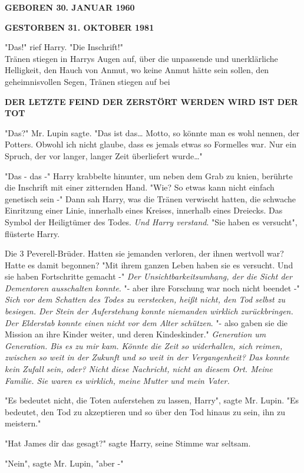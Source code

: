 {\textbf{GEBOREN 30. JANUAR 1960}

\textbf{GESTORBEN 31. OKTOBER 1981}

"Das!" rief Harry. "Die Inschrift!"\\ Tränen stiegen in Harrys Augen auf, über die unpassende und unerklärliche Helligkeit, den Hauch von Anmut, wo keine Anmut hätte sein sollen, den geheimnisvollen Segen, Tränen stiegen auf bei

\textbf{DER LETZTE FEIND DER ZERSTÖRT WERDEN WIRD IST DER TOT}

"Das?" Mr. Lupin sagte. "Das ist das… Motto, so könnte man es wohl nennen, der Potters. Obwohl ich nicht glaube, dass es jemals etwas so Formelles war. Nur ein Spruch, der vor langer, langer Zeit überliefert wurde…"

"Das - das -" Harry krabbelte hinunter, um neben dem Grab zu knien, berührte die Inschrift mit einer zitternden Hand. "Wie? So etwas kann nicht einfach genetisch sein -" Dann sah Harry, was die Tränen verwischt hatten, die schwache Einritzung einer Linie, innerhalb eines Kreises, innerhalb eines Dreiecks. Das Symbol der Heiligtümer des Todes. \emph{Und Harry verstand}. "Sie haben es versucht", flüsterte Harry.

Die 3 Peverell-Brüder. Hatten sie jemanden verloren, der ihnen wertvoll war? Hatte es damit begonnen? "Mit ihrem ganzen Leben haben sie es versucht. Und sie haben Fortschritte gemacht -" \emph{Der Unsichtbarkeitsumhang, der die Sicht der Dementoren ausschalten konnte}. "- aber ihre Forschung war noch nicht beendet -" \emph{Sich vor dem Schatten des Todes zu verstecken, heißt nicht, den Tod selbst zu besiegen. Der Stein der Auferstehung konnte niemanden wirklich zurückbringen. Der Elderstab konnte einen nicht vor dem Alter schützen}. "- also gaben sie die Mission an ihre Kinder weiter, und deren Kindeskinder." \emph{Generation um Generation. Bis es zu mir kam. Könnte die Zeit so widerhallen, sich reimen, zwischen so weit in der Zukunft und so weit in der Vergangenheit? Das konnte kein Zufall sein, oder? Nicht diese Nachricht, nicht an diesem Ort. Meine Familie. Sie waren es wirklich, meine Mutter und mein Vater.}

"Es bedeutet nicht, die Toten auferstehen zu lassen, Harry", sagte Mr. Lupin. "Es bedeutet, den Tod zu akzeptieren und so über den Tod hinaus zu sein, ihn zu meistern."

"Hat James dir das gesagt?" sagte Harry, seine Stimme war seltsam.

"Nein", sagte Mr. Lupin, "aber -"

}

